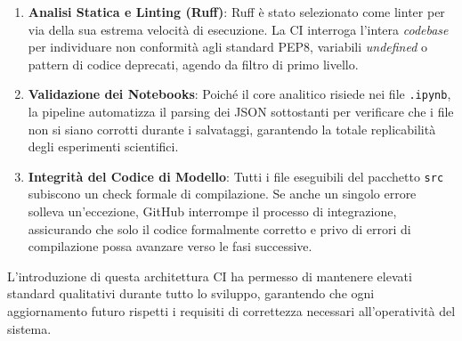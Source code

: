 \begin{enumerate}
    \item \textbf{Analisi Statica e Linting (Ruff)}: Ruff è stato selezionato come linter per via della sua estrema velocità di esecuzione. La CI interroga l'intera \textit{codebase} per individuare non conformità agli standard PEP8, variabili \textit{undefined} o pattern di codice deprecati, agendo da filtro di primo livello.
    \item \textbf{Validazione dei Notebooks}: Poiché il core analitico risiede nei file \texttt{.ipynb}, la pipeline automatizza il parsing dei JSON sottostanti per verificare che i file non si siano corrotti durante i salvataggi, garantendo la totale replicabilità degli esperimenti scientifici.
    \item \textbf{Integrità del Codice di Modello}: Tutti i file eseguibili del pacchetto \texttt{src} subiscono un check formale di compilazione. Se anche un singolo errore solleva un'eccezione, GitHub interrompe il processo di integrazione, assicurando che solo il codice formalmente corretto e privo di errori di compilazione possa avanzare verso le fasi successive.
\end{enumerate}

L'introduzione di questa architettura CI ha permesso di mantenere elevati standard qualitativi durante tutto lo sviluppo, garantendo che ogni aggiornamento futuro rispetti i requisiti di correttezza necessari all'operatività del sistema.

